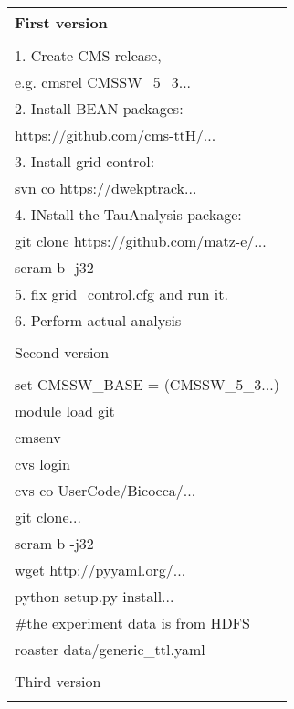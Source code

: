 \documentclass{acm_proc_article-sp}
\begin{document}
\begin{table}
    \centering
    \begin{tabular}{|l|}
        \hline
        First version \\ \hline
        \\
        1. Create CMS release,\\
            \hspace{9pt} e.g. cmsrel CMSSW\_5\_3... \\
        2. Install BEAN packages: \\
            \hspace{9pt} https://github.com/cms-ttH/...\\
        3. Install grid-control: \\ 
            \hspace{9pt} svn co https://dwekptrack... \\
        4. INstall the TauAnalysis package: \\
           \hspace{9pt} git clone https://github.com/matz-e/... \\
           \hspace{9pt} scram b -j32 \\
        5. fix grid\_control.cfg and run it. \\
        6. Perform actual analysis \\ 
        \\ \hline
        Second version \\ \hline
        \\
        set CMSSW\_BASE = (CMSSW\_5\_3...) \\
        module load git \\        
        cmsenv \\ 
        cvs login \\
        cvs co UserCode/Bicocca/... \\
        git clone... \\
        scram b -j32 \\
        wget http://pyyaml.org/... \\
        python setup.py install... \\
        \#the experiment data is from HDFS \\
        roaster data/generic\_ttl.yaml \\ 
        \\ \hline
        Third version \\ \hline
        \\

\end{tabular}
\end{table}
\end{document}
